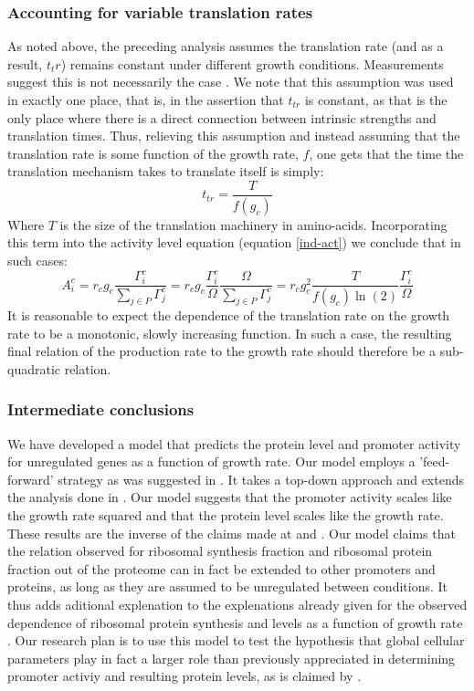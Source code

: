 \documentclass{report}
\begin{document}
\subsubsection{Accounting for variable translation rates}
As noted above, the preceding analysis assumes the translation rate (and as a result, $t_tr$) remains constant under different growth conditions.
Measurements suggest this is not necessarily the case \cite{Liang2000}.
We note that this assumption was used in exactly one place, that is, in the assertion that $t_{tr}$ is constant, as that is the only place where there is a direct connection between intrinsic strengths and translation times.
Thus, relieving this assumption and instead assuming that the translation rate is some function of the growth rate, $f$, one gets that the time the translation mechanism takes to translate itself is simply:
\begin{equation}
t_{tr}=\frac{T}{f(g_c)}
\end{equation}
Where $T$ is the size of the translation machinery in amino-acids.
Incorporating this term into the activity level equation (equation \ref{ind-act}) we conclude that in such cases:
\begin{equation}
A^c_i=r_c g_c \frac{\Gamma^c_i}{\sum_{j\in P}\Gamma^c_j}=r_c g_c \frac{\Gamma^c_i}{\Omega}\frac{\Omega}{\sum_{j\in P}\Gamma^c_j}=r_c g_c^2\frac{T}{f(g_c)\ln(2)}\frac{\Gamma^c_i}{\Omega}
\end{equation}
It is reasonable to expect the dependence of the translation rate on the growth rate to be a monotonic, slowly increasing function.
In such a case, the resulting final relation of the production rate to the growth rate should therefore be a sub-quadratic relation.
\subsubsection{Intermediate conclusions}
We have developed a model that predicts the protein level and promoter activity for unregulated genes as a function of growth rate.
Our model employs a 'feed-forward' strategy as was suggested in \cite{Levy2009}.
It takes a top-down approach and extends the analysis done in \cite{Leeat2013}.
Our model suggests that the promoter activity scales like the growth rate squared and that the protein level scales like the growth rate.
These results are the inverse of the claims made at \cite{Klumpp2009a} and \cite{Scott2010a}.
Our model claims that the relation observed for ribosomal synthesis fraction and ribosomal protein fraction out of the proteome can in fact be extended to other promoters and proteins, as long as they are assumed to be unregulated between conditions.
It thus adds aditional explenation to the explenations already given for the observed dependence of ribosomal protein synthesis and levels as a function of growth rate \cite{Zaslaver2009a}.
Our research plan is to use this model to test the hypothesis that global cellular parameters play in fact a larger role than previously appreciated in determining promoter activiy and resulting protein levels, as is claimed by \cite{Berthoumieux2013}.
\end{document}
